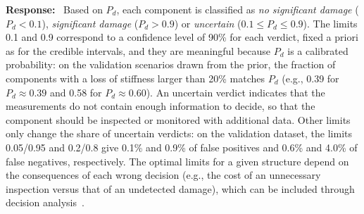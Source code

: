 \documentclass[11pt]{article}
\newenvironment{response}{\par\smallskip\noindent\color{resp}\textbf{Response:}\ }{\par}
\begin{document}
\begin{response}
Based on $P_d$, each component is classified as \emph{no significant damage} ($P_d<0.1$), \emph{significant damage} ($P_d>0.9$) or \emph{uncertain} ($0.1\le P_d\le0.9$).
The limits 0.1 and 0.9 correspond to a confidence level of 90\% for each verdict, fixed a priori as for the credible intervals, and they are meaningful because $P_d$ is a calibrated probability: on the validation scenarios drawn from the prior, the fraction of components with a loss of stiffness larger than 20\% matches $P_d$ (e.g., 0.39 for $P_d\approx0.39$ and 0.58 for $P_d\approx0.60$).
An uncertain verdict indicates that the measurements do not contain enough information to decide, so that the component should be inspected or monitored with additional data.
Other limits only change the share of uncertain verdicts: on the validation dataset, the limits 0.05/0.95 and 0.2/0.8 give 0.1\% and 0.9\% of false positives and 0.6\% and 4.0\% of false negatives, respectively.
The optimal limits for a given structure depend on the consequences of each wrong decision (e.g., the cost of an unnecessary inspection versus that of an undetected damage), which can be included through decision analysis~\cite{kamariotis2022value}.


\end{response}
\end{document}
